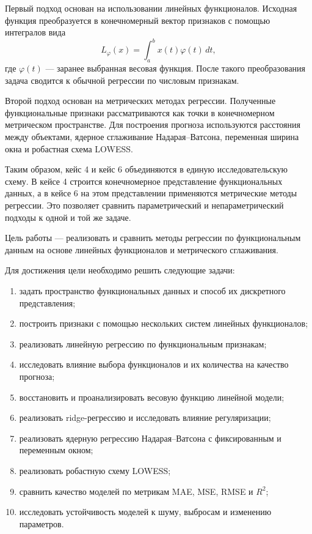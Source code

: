\documentclass[14pt,a4paper]{extarticle}
\begin{document}
Первый подход основан на использовании линейных функционалов. Исходная функция преобразуется в конечномерный вектор признаков с помощью интегралов вида
\[
L_{\varphi}(x)=\int_a^b x(t)\varphi(t)\,dt,
\]
где \(\varphi(t)\) — заранее выбранная весовая функция. После такого преобразования задача сводится к обычной регрессии по числовым признакам.

Второй подход основан на метрических методах регрессии. Полученные функциональные признаки рассматриваются как точки в конечномерном метрическом пространстве. Для построения прогноза используются расстояния между объектами, ядерное сглаживание Надарая--Ватсона, переменная ширина окна и робастная схема LOWESS.

Таким образом, кейс 4 и кейс 6 объединяются в единую исследовательскую схему. В кейсе 4 строится конечномерное представление функциональных данных, а в кейсе 6 на этом представлении применяются метрические методы регрессии. Это позволяет сравнить параметрический и непараметрический подходы к одной и той же задаче.

Цель работы — реализовать и сравнить методы регрессии по функциональным данным на основе линейных функционалов и метрического сглаживания.

Для достижения цели необходимо решить следующие задачи:
\begin{enumerate}
    \item задать пространство функциональных данных и способ их дискретного представления;
    \item построить признаки с помощью нескольких систем линейных функционалов;
    \item реализовать линейную регрессию по функциональным признакам;
    \item исследовать влияние выбора функционалов и их количества на качество прогноза;
    \item восстановить и проанализировать весовую функцию линейной модели;
    \item реализовать ridge-регрессию и исследовать влияние регуляризации;
    \item реализовать ядерную регрессию Надарая--Ватсона с фиксированным и переменным окном;
    \item реализовать робастную схему LOWESS;
    \item сравнить качество моделей по метрикам MAE, MSE, RMSE и \(R^2\);
    \item исследовать устойчивость моделей к шуму, выбросам и изменению параметров.
\end{enumerate}
\end{document}
